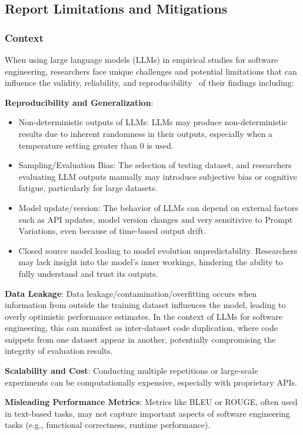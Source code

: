 \documentclass[11pt]{article}
\begin{document}
\subsection{Report Limitations and Mitigations}

\subsubsection{Context}
When using large language models (LLMs) in empirical studies for software engineering, researchers face unique challenges and potential limitations that can influence the validity, reliability, and reproducibility~\cite{sallou2024breaking} of their findings including:


\textbf{Reproducibility and Generalization}:
\begin{itemize}
  \item Non-deterministic outputs of LLMs: LLMs may produce non-deterministic results due to inherent randomness in their outputs, especially when a temperature setting greater than 0 is used.
  \item Sampling/Evaluation Bias: The selection of testing dataset, and researchers evaluating LLM outputs manually may introduce subjective bias or cognitive fatigue, particularly for large datasets.
  \item Model update/version:  The behavior of LLMs can depend on external factors such as API updates, model version changes and very sensitivive to Prompt Variations, even because of time-based output drift.
  \item Closed source model leading to model evolution unpredictability. Researchers may lack insight into the model's inner workings, hindering the ability to fully understand and trust its outputs.
\end{itemize}

\textbf{Data Leakage}:
Data leakage/contamination/overfitting occurs when information from outside the training dataset influences the model, leading to overly optimistic performance estimates. In the context of LLMs for software engineering, this can manifest as inter-dataset code duplication, where code snippets from one dataset appear in another, potentially compromising the integrity of evaluation results.

\textbf{Scalability and Cost}:
Conducting multiple repetitions or large-scale experiments can be computationally expensive, especially with proprietary APIs.

\textbf{Misleading Performance Metrics}:
Metrics like BLEU or ROUGE, often used in text-based tasks, may not capture important aspects of software engineering tasks (e.g., functional correctness, runtime performance).
\end{document}
